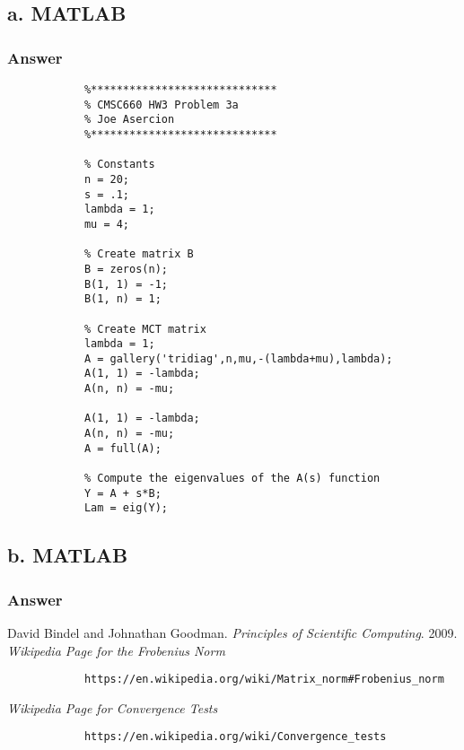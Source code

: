 \documentclass{article}
\begin{document}
		\subsection{a. MATLAB}
			\subsubsection{Answer}
			\begin{lstlisting}
			%*****************************
			% CMSC660 HW3 Problem 3a
			% Joe Asercion
			%***************************** 
			
			% Constants
			n = 20;
			s = .1;
			lambda = 1;
			mu = 4;
			
			% Create matrix B
			B = zeros(n);
			B(1, 1) = -1;
			B(1, n) = 1;
			
			% Create MCT matrix
			lambda = 1;
			A = gallery('tridiag',n,mu,-(lambda+mu),lambda);
			A(1, 1) = -lambda;
			A(n, n) = -mu;
			
			A(1, 1) = -lambda;
			A(n, n) = -mu;
			A = full(A);
			
			% Compute the eigenvalues of the A(s) function
			Y = A + s*B;
			Lam = eig(Y);
			\end{lstlisting}
			
		\subsection{b. MATLAB}
			\subsubsection{Answer}
	
	\begin{thebibliography}{2}
		David Bindel and Johnathan Goodman.
		\textit{Principles of Scientific Computing}. 
		2009.
		\textit{Wikipedia Page for the Frobenius Norm}
		\begin{verbatim}
			https://en.wikipedia.org/wiki/Matrix_norm#Frobenius_norm
		\end{verbatim}
		\textit{Wikipedia Page for Convergence Tests}
		\begin{verbatim}
			https://en.wikipedia.org/wiki/Convergence_tests
		\end{verbatim}
		
	\end{thebibliography}
	
	
	 
\end{document}
